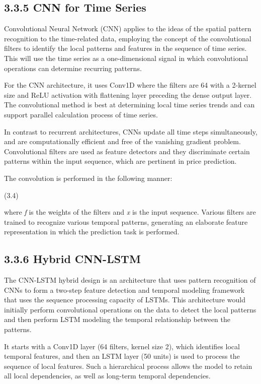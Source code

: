 \documentclass[12pt,a4paper]{report}
\begin{document}
\subsection{3.3.5 CNN for Time Series}
Convolutional Neural Network (CNN) applies to the ideas of the spatial pattern recognition to the time-related data, employing the concept of the convolutional filters to identify the local patterns and features in the sequence of time series. This will use the time series as a one-dimensional signal in which convolutional operations can determine recurring patterns.

For the CNN architecture, it uses Conv1D where the filters are 64 with a 2-kernel size and ReLU activation with flattening layer preceding the dense output layer. The convolutional method is best at determining local time series trends and can support parallel calculation process of time series.

In contrast to recurrent architectures, CNNs update all time steps simultaneously, and are computationally efficient and free of the vanishing gradient problem. Convolutional filters are used as feature detectors and they discriminate certain patterns within the input sequence, which are pertinent in price prediction.

The convolution is performed in the following manner:

									(3.4)

where \textit{f }is the weights of the filters and \textit{x }is the input sequence. Various filters are trained to recognize various temporal patterns, generating an elaborate feature representation in which the prediction task is performed.

\subsection{3.3.6 Hybrid CNN-LSTM}
The CNN-LSTM hybrid design is an architecture that uses pattern recognition of CNNs to form a two-step feature detection and temporal modeling framework that uses the sequence processing capacity of LSTMs. This architecture would initially perform convolutional operations on the data to detect the local patterns and then perform LSTM modeling the temporal relationship between the patterns.

It starts with a Conv1D layer (64 filters, kernel size 2), which identifies local temporal features, and then an LSTM layer (50 units) is used to process the sequence of local features. Such a hierarchical process allows the model to retain all local dependencies, as well as long-term temporal dependencies.
\end{document}
